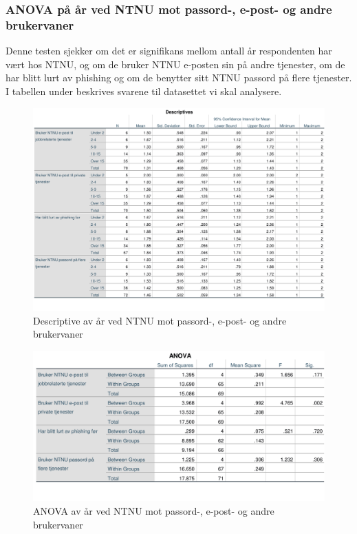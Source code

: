 \subsubsection{ANOVA på år ved NTNU mot passord-, e-post- og andre brukervaner}
Denne testen sjekker om det er signifikans mellom antall år respondenten har vært hos NTNU, og om de bruker NTNU e-posten sin på andre tjenester, om de har blitt lurt av phishing og om de benytter sitt NTNU passord på flere tjenester. I tabellen under beskrives svarene til datasettet vi skal analysere.
\begin{figure}[H]
    \centering
    \includegraphics[scale=0.5]{case_2/bilder/spss/anova_ttest/ansiennitet_diverse_descriptive.pdf}
    \caption[Descriptive av år ved NTNU mot passord-, e-post- og andre brukervaner]{Descriptive av år ved NTNU mot passord-, e-post- og andre brukervaner}
    \label{fig:ansiennitet-diverse-descriptive}
\end{figure}

\begin{figure}[H]
    \centering
    \includegraphics[scale=0.7]{case_2/bilder/spss/anova_ttest/ansiennitet_diverse_anova.pdf}
    \caption[ANOVA av år ved NTNU mot passord-, e-post- og andre brukervaner]{ANOVA av år ved NTNU mot passord-, e-post- og andre brukervaner}
    \label{fig:ansiennitet-diverse-ANOVA}
\end{figure}

